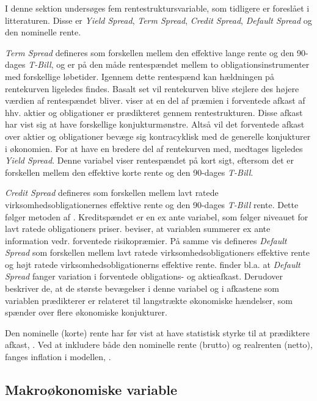 \documentclass[
  a4paper,
  oneside]{memoir}
\begin{document}
I denne sektion undersøges fem rentestruktursvariable, som tidligere er foreslået i litteraturen. Disse er \emph{Yield Spread}, \emph{Term Spread}, \emph{Credit Spread}, \emph{Default Spread} og den nominelle rente.

\emph{Term Spread} defineres som forskellen mellem den effektive lange rente og den 90-dages \emph{T-Bill}, og er på den måde rentespændet mellem to obligationsinstrumenter med forskellige løbetider. Igennem dette rentespænd kan hældningen på rentekurven ligeledes findes. Basalt set vil rentekurven blive stejlere des højere værdien af rentespændet bliver. \citep{Fama1989} viser at en del af præmien i forventede afkast af hhv. aktier og obligationer er prædikteret gennem rentestrukturen. Disse afkast har vist sig at have forskellige konjukturmønstre. Altså vil det forventede afkast over aktier og obligationer bevæge sig kontracyklisk med de generelle konjukturer i økonomien. For at have en bredere del af rentekurven med, medtages ligeledes \emph{Yield Spread}. Denne variabel viser rentespændet på kort sigt, eftersom det er forskellen mellem den effektive korte rente og den 90-dages \emph{T-Bill}.

\emph{Credit Spread} defineres som forskellen mellem lavt ratede virksomhedsobligationernes effektive rente og den 90-dages \emph{T-Bill} rente. Dette følger metoden af \citep{Keim1986}. Kreditspændet er en ex ante variabel, som følger niveauet for lavt ratede obligationers priser. \citep{Keim1986} beviser, at variablen summerer ex ante information vedr. forventede risikopræmier. På samme vis defineres \emph{Default Spread} som forskellen mellem lavt ratede virksomhedsobligationers effektive rente og højt ratede virksomhedsobligationerns effektive rente. \citep{Fama1989} finder bl.a. at \emph{Default Spread} fanger variation i forventede obligations- og aktieafkast. Derudover beskriver de, at de største bevægelser i denne variabel og i afkastene som variablen prædikterer er relateret til langstrækte økonomiske hændelser, som spænder over flere økonomiske konjukturer.

Den nominelle (korte) rente har før vist at have statistisk styrke til at prædiktere afkast, \citep{Campbell2005}. Ved at inkludere både den nominelle rente (brutto) og realrenten (netto), fanges inflation i modellen, \citep{Campbell2005}.

\hypertarget{makrouxf8konomiske-variable}{%
\subsection{Makroøkonomiske variable}\label{makrouxf8konomiske-variable}}
\end{document}
